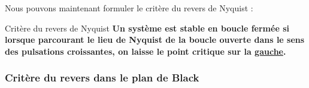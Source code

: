 Nous pouvons maintenant formuler le critère du revers de Nyquist :

\begin{criteria}{Critère du revers de Nyquist}
\textbf{Un système est stable en boucle fermée si lorsque parcourant 
        le lieu de Nyquist de la boucle ouverte dans le sens des 
        pulsations croissantes, on laisse le point critique sur la \underline{gauche}.}
\end{criteria}

\newpage
\subsubsection{Critère du revers dans le plan de Black}


